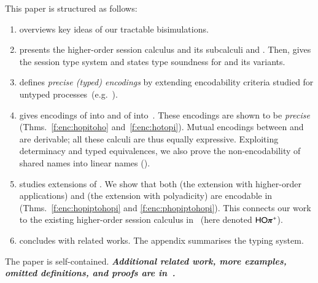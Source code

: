  This paper 
is structured as follows:
\begin{enumerate}[$\bullet$]
\item {} overviews key ideas of our tractable bisimulations.
\item {} presents the higher-order session calculus \HOp and its 
subcalculi \HO and \sessp.  Then,  gives the session type system
and states type soundness for \HOp and its variants.
\item {} defines \emph{precise (typed) encodings} by extending encodability criteria 
studied for
untyped processes~(e.g.~\cite{DBLP:journals/iandc/Gorla10,DBLP:conf/icalp/LanesePSS10}).
\item {} %
gives encodings of \HOp into \HO and of \HOp into~\sessp.
These encodings 
are shown to be \emph{precise} (Thms.~\ref{f:enc:hopitoho} and~\ref{f:enc:hotopi}).
Mutual encodings between \sessp and \HO are derivable; 
all these calculi are thus equally expressive.
Exploiting determinacy and typed equivalences,
we also prove the non-encodability of shared names
into linear names ().

\item {} studies extensions of \HOp. We show that 
both \HOpp (the extension with higher-order applications) 
and \pHOp (the extension with polyadicity) are encodable in \HOp
(Thms.~\ref{f:enc:hopiptohopi} and \ref{f:enc:phopiptohopi}).
This connects our work 
to the existing
higher-order session calculus in~\cite{tlca07} (here denoted  $\PHOpp$).

\item {} concludes with related works. The appendix summarises the typing system. 
\end{enumerate}
\noi
The paper is self-contained. 
{\bf\em Additional related work, more examples, omitted definitions, and  proofs 
are 
in~\cite{KouzapasPY15}.} 

